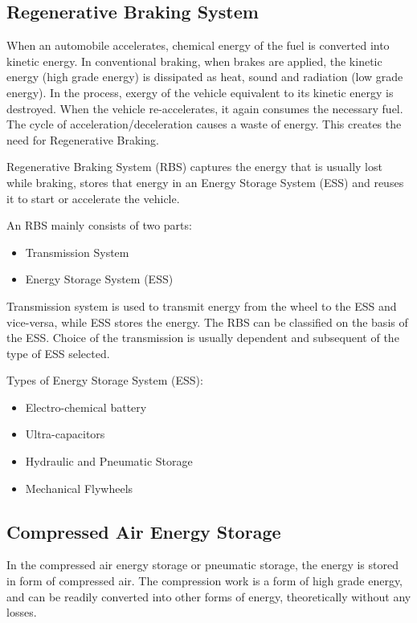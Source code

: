 \documentclass[12pt,a4paper]{article}
\begin{document}
	\subsection{Regenerative Braking System}
		When an automobile accelerates, chemical energy of the fuel is converted into kinetic energy. In conventional braking, when brakes are applied, the kinetic energy (high grade energy) is dissipated as heat, sound and radiation (low grade energy). In the process, exergy of the vehicle equivalent to its kinetic energy is destroyed. When the vehicle re-accelerates, it again consumes the necessary fuel. The cycle of acceleration/deceleration causes a waste of energy. This creates the need for Regenerative Braking.

		Regenerative Braking System (RBS) captures the energy that is usually lost while braking, stores that energy in an Energy Storage System (ESS) and reuses it to start or accelerate the vehicle.

		An RBS mainly consists of two parts:

		\begin{itemize}
			\item Transmission System
			\item Energy Storage System (ESS)
		\end{itemize}

		Transmission system is used to transmit energy from the wheel to the ESS and vice-versa, while ESS stores the energy. The RBS can be classified on the basis of the ESS. Choice of the transmission is usually dependent and subsequent of the type of ESS selected.

		Types of Energy Storage System (ESS):

		\begin{itemize}
			\item Electro-chemical battery
			\item Ultra-capacitors
			\item Hydraulic and Pneumatic Storage
			\item Mechanical Flywheels
		\end{itemize}

	\subsection{Compressed Air Energy Storage}
		In the compressed air energy storage or pneumatic storage, the energy is stored in form of compressed air. The compression work is a form of high grade energy, and can be readily converted into other forms of energy, theoretically without any losses.
\end{document}
